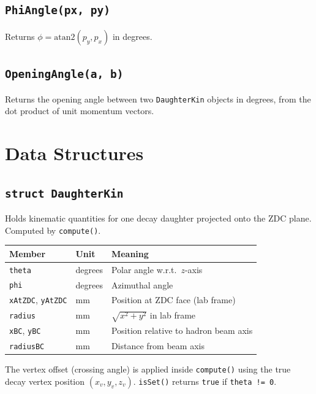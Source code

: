 \documentclass[11pt]{article}
\begin{document}
\subsection{\texttt{PhiAngle(px, py)}}
Returns $\phi = \text{atan2}(p_y, p_x)$ in degrees.

\subsection{\texttt{OpeningAngle(a, b)}}
Returns the opening angle between two \texttt{DaughterKin} objects in
degrees, from the dot product of unit momentum vectors.

\section{Data Structures}

\subsection{\texttt{struct DaughterKin}}

Holds kinematic quantities for one decay daughter projected onto the ZDC
plane. Computed by \texttt{compute()}.

\begin{center}
\renewcommand{\arraystretch}{1.3}
\begin{tabular}{lll}
\toprule
Member & Unit & Meaning \\
\midrule
\texttt{theta} & degrees & Polar angle w.r.t.\ $z$-axis \\
\texttt{phi} & degrees & Azimuthal angle \\
\texttt{xAtZDC}, \texttt{yAtZDC} & mm & Position at ZDC face (lab frame) \\
\texttt{radius} & mm & $\sqrt{x^2+y^2}$ in lab frame \\
\texttt{xBC}, \texttt{yBC} & mm & Position relative to hadron beam axis \\
\texttt{radiusBC} & mm & Distance from beam axis \\
\bottomrule
\end{tabular}
\end{center}

The vertex offset (crossing angle) is applied inside \texttt{compute()}
using the true decay vertex position $(x_v, y_v, z_v)$.
\texttt{isSet()} returns \texttt{true} if \texttt{theta != 0}.
\end{document}
